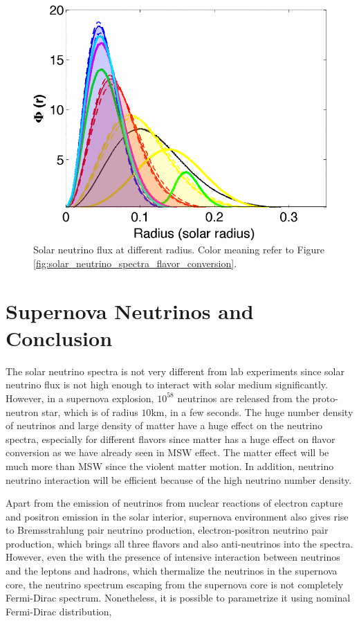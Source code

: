 \begin{figure}
\centering
\includegraphics[width=\columnwidth]{chapters/assets/solar/solar_neutrino_production_radius.png}
\caption{Solar neutrino flux at different radius. Color meaning refer to Figure \ref{fig:solar_neutrino_spectra_flavor_conversion}.}
\label{fig:solar_neutrino_production_radius}
\end{figure}



\section{Supernova Neutrinos and Conclusion}


The solar neutrino spectra is not very different from lab experiments since solar neutrino flux is not high enough to interact with solar medium significantly. However, in a supernova explosion, $10^{58}$ neutrinos are released from the proto-neutron star, which is of radius $10\mathrm{km}$, in a few seconds. The huge number density of neutrinos and large density of matter have a huge effect on the neutrino spectra, especially for different flavors since matter has a huge effect on flavor conversion as we have already seen in MSW effect. The matter effect will be much more than MSW since the violent matter motion. In addition, neutrino neutrino interaction will be efficient because of the high neutrino number density.

Apart from the emission of neutrinos from nuclear reactions of electron capture and positron emission in the solar interior, supernova environment also gives rise to Bremsstrahlung pair neutrino production, electron-positron neutrino pair production, which brings all three flavors and also anti-neutrinos into the spectra. However, even the with the presence of intensive interaction between neutrinos and the leptons and hadrons, which thermalize the neutrinos in the supernova core, the neutrino spectrum escaping from the supernova core is not completely Fermi-Dirac spectrum. Nonetheless, it is possible to parametrize it using nominal Fermi-Dirac distribution,\cite{ysuzuki2004}

